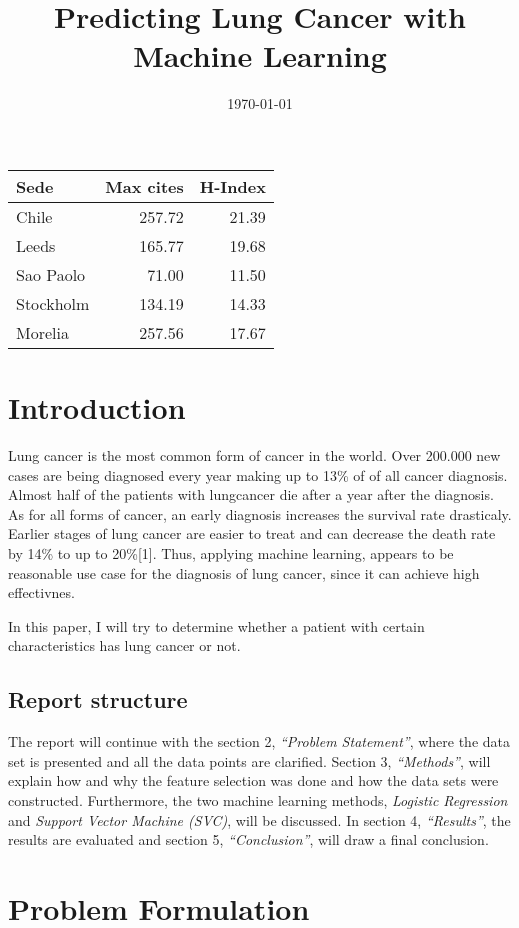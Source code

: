 \documentclass[a4paper,12pt]{article}
\date{\today}
\title{Predicting Lung Cancer with Machine Learning}
\begin{document}
\maketitle
\begin{center}
\begin{tabular}{lrr}
Sede & Max cites & H-Index\\
\hline
Chile & 257.72 & 21.39\\
Leeds & 165.77 & 19.68\\
Sao Paolo & 71.00 & 11.50\\
Stockholm & 134.19 & 14.33\\
Morelia & 257.56 & 17.67\\
\end{tabular}
\end{center}
\section{Introduction}
\label{sec:orga0b82b3}
Lung cancer is the most common form of cancer in the world. Over 200.000 new cases are being diagnosed every year making up to 13\% of of all cancer diagnosis. Almost half of the patients with lungcancer die after a year after the diagnosis.
As for all forms of cancer, an early diagnosis increases the survival rate drasticaly. Earlier stages of lung cancer are easier to treat and can decrease the death rate by 14\% to up to 20\%[1].
Thus, applying machine learning, appears to be reasonable use case for the diagnosis of lung cancer, since it can achieve high effectivnes.

In this paper, I will try to determine whether a patient with certain characteristics has lung cancer or not.

\subsection{Report structure}
\label{sec:orgb897d65}
The report will continue with the section 2, \emph{``Problem Statement''}, where the data set is presented and all the data points are clarified.
Section 3, \emph{``Methods''}, will explain how and why the feature selection was done and how the data sets were constructed.
Furthermore, the two machine learning methods, \emph{Logistic Regression} and \emph{Support Vector Machine (SVC)}, will be discussed.
In section 4, \emph{``Results''}, the results are evaluated and section 5, \emph{``Conclusion''}, will draw a final conclusion.

\section{Problem Formulation}
\label{sec:orgd0af7e1}
\end{document}
